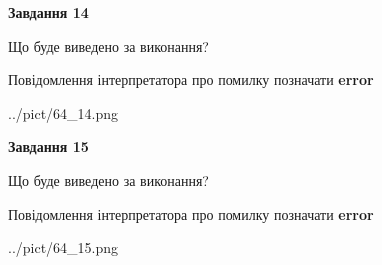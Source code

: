 \documentclass[11pt, ukrainian]{article}
\begin{document}
{\begin {large}
{\begin {center}\textbf{Завдання 14}\end {center}}\par
Що буде виведено за виконання? \par
Повідомлення інтерпретатора про помилку позначати \textbf{error}

\begin{center}
	{../pict/64_14.png}
\end{center}
\newpage

{\begin {center}\textbf{Завдання 15}\end {center}}\par
Що буде виведено за виконання? \par
Повідомлення інтерпретатора про помилку позначати \textbf{error}

\begin{center}
	{../pict/64_15.png}
\end{center}
\newpage

\end {large}}
\end{document}
